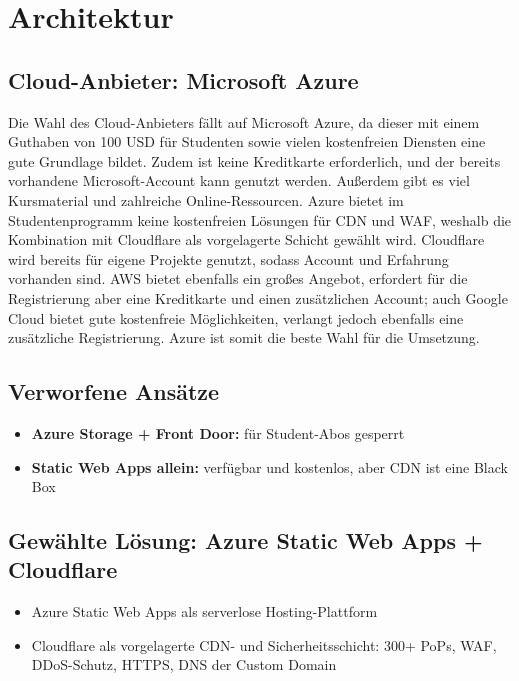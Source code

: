 \documentclass[11pt,a4paper]{article}
\newcommand{\lbl}[1]{\textbf{#1:}\;}
\begin{document}
\section{Architektur}

\subsection{Cloud-Anbieter: Microsoft Azure}
Die Wahl des Cloud-Anbieters fällt auf Microsoft Azure, da dieser mit einem Guthaben von
100 USD für Studenten sowie vielen kostenfreien Diensten eine gute Grundlage bildet. Zudem
ist keine Kreditkarte erforderlich, und der bereits vorhandene Microsoft-Account kann genutzt
werden. Außerdem gibt es viel Kursmaterial und zahlreiche Online-Ressourcen. Azure bietet im
Studentenprogramm keine kostenfreien Lösungen für CDN und WAF, weshalb die Kombination mit
Cloudflare als vorgelagerte Schicht gewählt wird. Cloudflare wird bereits für eigene Projekte
genutzt, sodass Account und Erfahrung vorhanden sind. AWS bietet ebenfalls ein großes Angebot,
erfordert für die Registrierung aber eine Kreditkarte und einen zusätzlichen Account; auch
Google Cloud bietet gute kostenfreie Möglichkeiten, verlangt jedoch ebenfalls eine zusätzliche
Registrierung. Azure ist somit die beste Wahl für die Umsetzung.

\subsection{Verworfene Ansätze}
\begin{itemize}
  \item \lbl{Azure Storage + Front Door} für Student-Abos gesperrt
  \item \lbl{Static Web Apps allein} verfügbar und kostenlos, aber CDN ist eine Black Box
\end{itemize}

\subsection{Gewählte Lösung: Azure Static Web Apps + Cloudflare}
\begin{itemize}
  \item Azure Static Web Apps als serverlose Hosting-Plattform
  \item Cloudflare als vorgelagerte CDN- und Sicherheitsschicht:
        300+ PoPs, WAF, DDoS-Schutz, HTTPS, DNS der Custom Domain
\end{itemize}
\newpage
\end{document}
